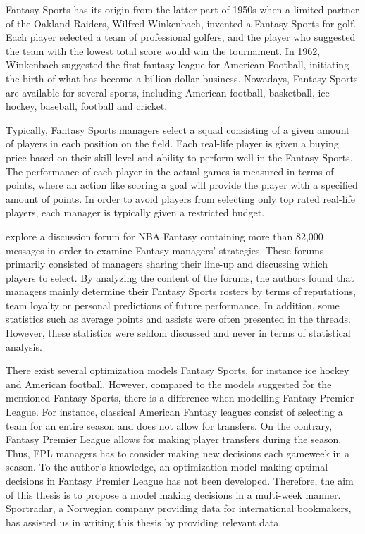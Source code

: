 \newpar

Fantasy Sports has its origin from the latter part of 1950s when a limited partner of the Oakland Raiders, Wilfred Winkenbach, invented a Fantasy Sports for golf. Each player selected a team of professional golfers, and the player who suggested the team with the lowest total score would win the tournament. In 1962, Winkenbach suggested the first fantasy league for American Football, initiating the birth of what has become a billion-dollar business. Nowadays, Fantasy Sports are available for several sports, including American football, basketball, ice hockey, baseball, football and cricket.  

\newpar

Typically, Fantasy Sports managers select a squad consisting of a given amount of players in each position on the field. Each real-life player is given a buying price based on their skill level and ability to perform well in the Fantasy Sports. The performance of each player in the actual games is measured in terms of points, where an action like scoring a goal will provide the player with a specified amount of points. In order to avoid players from selecting only top rated real-life players, each manager is typically given a restricted budget.

\newpar

 \cite{Smith} explore a discussion forum for NBA Fantasy containing more than 82,000 messages in order to examine Fantasy managers' strategies. These forums primarily consisted of managers sharing their line-up and discussing which players to select. By analyzing the content of the forums, the authors found that managers mainly determine their Fantasy Sports rosters by terms of reputations, team loyalty or personal predictions of future performance. In addition, some statistics such as average points and assists were often presented in the threads. However, these statistics were seldom discussed and never in terms of statistical analysis. 

\newpar

There exist several optimization models Fantasy Sports, for instance ice hockey \citep{drafting_hockey_pools} and American football\citep{Fry}. However, compared to the models suggested for the mentioned Fantasy Sports, there is a difference when modelling Fantasy Premier League. For instance, classical American Fantasy leagues consist of selecting a team for an entire season and does not allow for transfers. On the contrary, Fantasy Premier League allows for making player transfers during the season. Thus, FPL managers has to consider making new decisions each gameweek in a season. To the author's knowledge, an optimization model making optimal decisions in Fantasy Premier League has not been developed. Therefore, the aim of this thesis is to propose a model making decisions in a multi-week manner. Sportradar, a Norwegian company providing data for international bookmakers, has assisted us in writing this thesis by providing relevant data.



